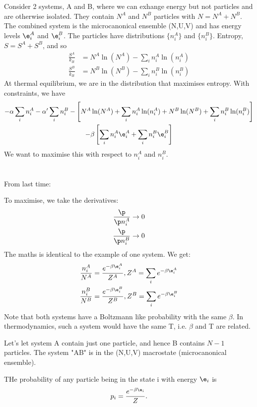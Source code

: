\documentclass[a4paper, 11pt, normalem]{report}
\begin{document}
Consider 2 systems, A and B, where we can exhange energy but not particles and are otherwise isolated.
They contain $N^A$ and $N^B$ particles with $N = N^A + N^B$.
The combined system is the microcanonical ensemble (N,U,V) and has energy levels $\e_i^A$ and $\e_i^B$.
The particles have distributions $\{n_i^A\}$ and $\{n_i^B\}$.
Entropy, $S = S^A + S^B$, and so
\begin{align}
    \frac{S^A}{k_B} &= N^A\ln(N^A) - \sum_i n_i^A\ln(n_i^A) \\
    \frac{S^B}{k_B} &= N^B\ln(N^B) - \sum_i n_i^B\ln(n_i^B)
\end{align}
At thermal equilibrium, we are in the distribution that maximises entropy.
With constraints, we have
\begin{multline}
    -\alpha\sum_i n_i^A - \alpha'\sum_i n_i^B - \left[N^A\ln(N^A) + \sum_i n_i^A\ln(n_i^A) + N^B\ln(N^B) + \sum_i n_i^B\ln(n_i^B)\right] \\ -\beta\left[\sum_i n_i^A\e_i^A + \sum_i n_i^B\e_i^B\right]
\end{multline}
We want to maximise this with respect to $n_i^A$ and $n_i^B$.

\chapter{}
From last time:

To maximise, we take the derivatives:
\begin{align}
    \frac{\p}{\p n_i^A} &\to 0 \\
    \frac{\p}{\p n_i^B} &\to 0
\end{align}
The maths is identical to the example of one system.
We get:
\begin{align}
    \frac{n_i^A}{N^A} &= \frac{e^{-\beta\e_i^A}}{Z^A}, Z^A = \sum_i e^{-\beta\e_i^A} \\
    \frac{n_i^B}{N^B} &= \frac{e^{-\beta\e_i^B}}{Z^B}, Z^B = \sum_i e^{-\beta\e_i^B}
\end{align}
Note that both systems have a Boltzmann like probability with the same $\beta$.
In thermodynamics, such a system would have the same T, i.e. $\beta$ and T are related.

Let's let system A contain just one particle, and hence B contains $N-1$ particles.
The system "AB" is in the (N,U,V) macrostate (microcanonical ensemble).

THe probability of any particle being in the state i with energy $\e_i$ is
\begin{equation}
    p_i = \frac{e^{-\beta\e_i}}{Z}.
\end{equation}
\end{document}
